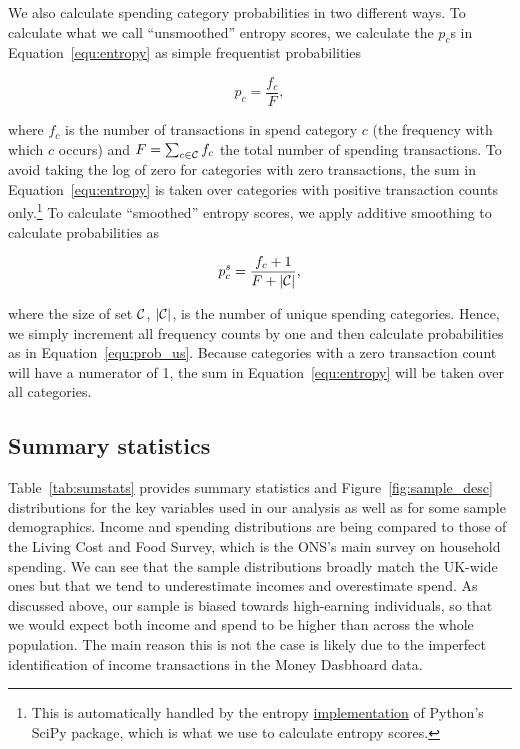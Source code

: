 We also calculate spending category probabilities in two different ways. To
calculate what we call ``unsmoothed'' entropy scores, we calculate the $p_c$s
in Equation~\ref{equ:entropy} as simple frequentist probabilities

\begin{equation}
    \label{equ:prob_us}
    p_c = \frac{f_c}{F},
\end{equation}

\noindent where $f_c$ is the number of transactions in spend category $c$ (the
frequency with which $c$ occurs) and $F = \sum_{c \in \mathcal{C}}f_c$ the total
number of spending transactions. To avoid taking the log of zero for categories
with zero transactions, the sum in Equation~\ref{equ:entropy} is taken over
categories with positive transaction counts only.\footnote{This is
    automatically handled by the entropy
    \href{https://docs.scipy.org/doc/scipy/reference/generated/scipy.stats.entropy.html}{implementation}
of Python's SciPy package, which is what we use to calculate entropy scores.}
To calculate ``smoothed'' entropy scores, we apply additive smoothing to
calculate probabilities as

\begin{equation}
    \label{equ:prob_s}
    p_c^{s} = \frac{f_c + 1}{F + |\mathcal{C}|},
\end{equation}

\noindent where the size of set $\mathcal{C}$, $|\mathcal{C}|$, is the number of unique
spending categories. Hence, we simply increment all frequency counts by one and
then calculate probabilities as in Equation~\ref{equ:prob_us}. Because
categories with a zero transaction count will have a numerator of 1, the sum in
Equation~\ref{equ:entropy} will be taken over all categories.


\subsection{Summary statistics}%
\label{par:summary_statistics}

Table~\ref{tab:sumstats} provides summary statistics and
Figure~\ref{fig:sample_desc} distributions for the key variables used in our
analysis as well as for some sample demographics. Income and spending
distributions are being compared to those of the Living Cost and Food
Survey, which is the ONS's main survey on household spending. We can see that
the sample distributions broadly match the UK-wide ones but that we tend to
underestimate incomes and overestimate spend. As discussed above, our sample is
biased towards high-earning individuals, so that we would expect both income
and spend to be higher than across the whole population. The main reason this
is not the case is likely due to the imperfect identification of income
transactions in the Money Dasbhoard data.

